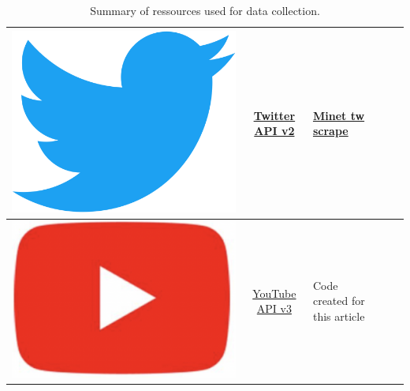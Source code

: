 \documentclass{article}
\begin{document}
\begin{table}[h]
\begin{tabular}{|l|c|l|l|l}
 \includegraphics[scale=0.007]{./img/tw_logo.png}  &  \href{https://developer.twitter.com/en/docs/twitter-api/early-access}{Twitter API v2} & \multicolumn{1}{l|}{\href{https://github.com/medialab/minet/blob/master/docs/cli.md\#twitter-scrape}{Minet tw scrape}}                                                                                                                                                                           \\ \hline
 \includegraphics[scale=0.03]{./img/yt_logo.png}  &  \href{https://developers.google.com/youtube/v3}{YouTube API v3}      &                                                                                                                            \multicolumn{1}{l|}{Code created for this article}                                                                                                                                                                           \\ \hline
\end{tabular}
\caption{Summary of ressources used for data collection.}
\label{tab1}
\end{table}
\end{document}
